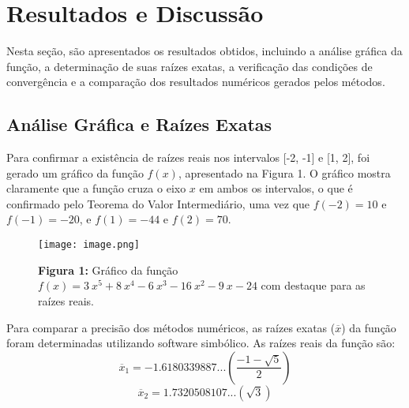 \documentclass[12pt, a4paper]{article}
\begin{document}
\section*{Resultados e Discussão}
Nesta seção, são apresentados os resultados obtidos, incluindo a análise gráfica da função, a determinação de suas raízes exatas, a verificação das condições de convergência e a comparação dos resultados numéricos gerados pelos métodos.

\subsection*{Análise Gráfica e Raízes Exatas}
Para confirmar a existência de raízes reais nos intervalos [-2, -1] e [1, 2], foi gerado um gráfico da função $f(x)$, apresentado na Figura 1. O gráfico mostra claramente que a função cruza o eixo $x$ em ambos os intervalos, o que é confirmado pelo Teorema do Valor Intermediário, uma vez que $f(-2) = 10$ e $f(-1) = -20$, e $f(1) = -44$ e $f(2) = 70$.

\begin{figure}[h!]
    \centering
    \texttt{[image: image.png]}
    \caption{\textbf{Figura 1:} Gráfico da função $f(x)=3~x^{5}+8~x^{4}-6~x^{3}-16~x^{2}-9~x-24$ com destaque para as raízes reais.}
    \label{fig:grafico}
\end{figure}

Para comparar a precisão dos métodos numéricos, as raízes exatas ($\overline{x}$) da função foram determinadas utilizando software simbólico. As raízes reais da função são:
\[ \overline{x}_1 = -1.6180339887... \left(\frac{-1-\sqrt{5}}{2}\right) \]
\[ \overline{x}_2 = 1.7320508107... (\sqrt{3}) \]
\end{document}
